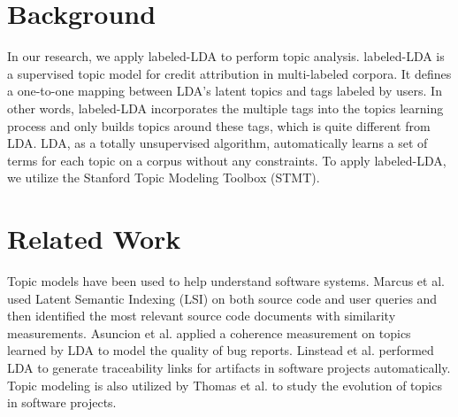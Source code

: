 \documentclass[10pt, conference, compsocconf]{IEEEtran}
\begin{document}




\section{Background}
In our research, we apply labeled-LDA to perform topic analysis. labeled-LDA is a supervised topic model for credit attribution in multi-labeled corpora\cite{labeledlda}. It defines a one-to-one mapping between LDA’s latent topics and tags labeled by users. In other words, labeled-LDA incorporates the multiple tags into the topics learning process and only builds topics around these tags, which is quite different from LDA. LDA, as a totally unsupervised algorithm, automatically learns a set of terms for each topic on a corpus without any constraints. To apply labeled-LDA, we utilize the Stanford Topic Modeling Toolbox (STMT)\cite{stmt}.





\section{Related Work}
Topic models have been used to help understand software systems. Marcus et al.\cite{Marcus04aninformation} used Latent Semantic Indexing (LSI) on both source code and user queries and then identified the most relevant source code documents with similarity measurements. Asuncion et al.\cite{Asuncion:2010} applied a coherence measurement on topics learned by LDA to model the quality of bug reports. Linstead et al.\cite{Linstead:2009} performed LDA to generate traceability links for artifacts in software projects automatically. Topic modeling is also utilized by Thomas et al.\cite{Thomas:2011} to study the evolution of topics in software projects.
\end{document}
